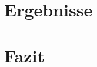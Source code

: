 \documentclass[
	12pt, %
	a4paper,
	listof=totoc, %
	bibliography=totoc, %
	numbers=noenddot, %
	ngerman, %
	headsepline, %
	oneside %
	]{scrbook} %
\begin{document}
%
%
%

\chapter{Ergebnisse}

\chapter{Fazit}
\end{document}
